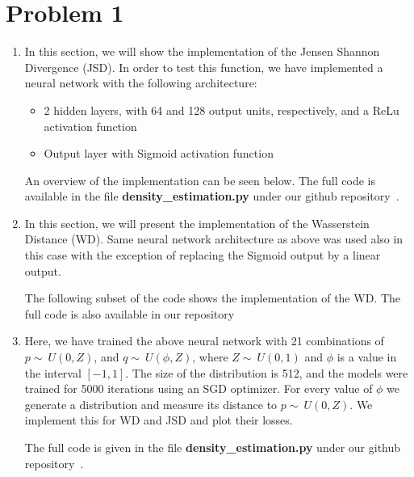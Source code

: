 \section*{Problem 1}
\begin{enumerate}
	\item In this section, we will show the implementation of the Jensen Shannon Divergence (JSD). In order to test this function, we have implemented a neural network with the following architecture:
	\begin{itemize}
		\item 2 hidden layers, with 64 and 128 output units, respectively, and a ReLu activation function
		\item Output layer with Sigmoid activation function 
	\end{itemize}

An overview of the implementation can be seen below. The full code is available in the file \textbf{density\_estimation.py} under our github repository~\cite{github}.
	
	
	
	\item In this section, we will present the implementation of the Wasserstein Distance (WD). Same neural network architecture as above was used also in this case with the exception of replacing the Sigmoid output by a linear output.
	
	The following subset of the code shows the implementation of the WD. The full code is also available in our repository~\cite{github}
	
	
	
	\item Here, we have trained the above neural network with 21 combinations of $p\sim~U(0,Z)$, and $q\sim~U(\phi,Z)$, where $Z\sim~U(0,1)$ and $\phi$ is a value in the interval $[-1,1]$. The size of the distribution is 512, and the models were trained for 5000 iterations using an SGD optimizer. For every value of $\phi$ we generate a distribution and measure its distance to $p\sim~U(0,Z)$. We implement this for WD and JSD and plot their losses. 
	
	The full code is given in the file \textbf{density\_estimation.py} under our github repository~\cite{github}.
	

\end{enumerate}
